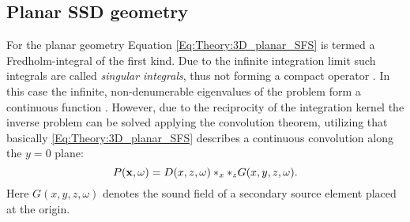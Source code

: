 \subsection{Planar SSD geometry}

For the planar geometry Equation \eqref{Eq:Theory:3D_planar_SFS} is termed a Fredholm-integral of the first kind. Due to the infinite integration limit such integrals are called \emph{singular integrals}, thus not forming a compact operator \cite[p.~921.]{MorseFeshbach1953}. 
In this case the infinite, non-denumerable eigenvalues of the problem form a continuous function \cite{MorseFeshbach1953,Schultz2014:Comparing_approaches}.
However, due to the reciprocity of the integration kernel the inverse problem can be solved applying the convolution theorem, utilizing that basically \eqref{Eq:Theory:3D_planar_SFS} describes a continuous convolution along the $y=0$ plane:
\begin{equation}
P(\mathbf{x},\omega) = D(x,z,\omega)\ast_{x} \ast_{z} G(x,y,z,\omega).
\end{equation}
Here $G(x,y,z,\omega)$ denotes the sound field of a secondary source element placed at the origin.

